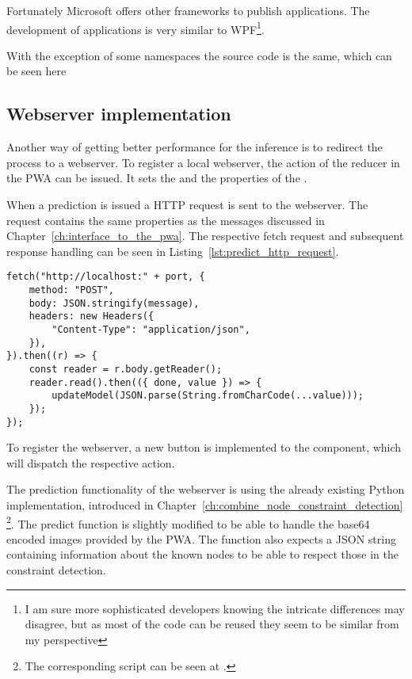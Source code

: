 Fortunately Microsoft offers other frameworks to publish applications.
The development of  applications is very similar to WPF\footnote{I am sure more sophisticated developers knowing the intricate differences may disagree, but as most of the code can be reused they seem to be similar from my perspective}.

With the exception of some namespaces the source code is the same, which can be seen here 

\subsection{Webserver implementation}

Another way of getting better performance for the inference is to redirect the process to a webserver.
To register a local webserver, the  action of the  reducer in the PWA can be issued.
It sets the  and the  properties of the .

When a prediction is issued a HTTP request is sent to the webserver.
The request  contains the same properties as the messages discussed in Chapter~\ref{ch:interface_to_the_pwa}.
The respective fetch request and subsequent response handling can be seen in Listing~\ref{lst:predict_http_request}.

\begin{lstlisting}[label={lst:predict_http_request}, caption={Communication of PWA via HTTP.}]
fetch("http://localhost:" + port, {
    method: "POST",
    body: JSON.stringify(message),
    headers: new Headers({
        "Content-Type": "application/json",
    }),
}).then((r) => {
    const reader = r.body.getReader();
    reader.read().then(({ done, value }) => {
        updateModel(JSON.parse(String.fromCharCode(...value)));
    });
});
\end{lstlisting}

To register the webserver, a new button is implemented to the  component, which will dispatch the respective  action. 

The prediction functionality of the webserver is using the already existing Python implementation, introduced in Chapter~\ref{ch:combine_node_constraint_detection}
\footnote{The corresponding script can be seen at .}.
The predict function is slightly modified to be able to handle the base64 encoded images provided by the PWA.
The function also expects a JSON string containing information about the known nodes to be able to respect those in the constraint detection.


